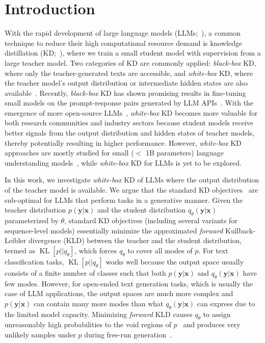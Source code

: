 \documentclass{article}
\def\forkl{\operatorname{KL}[p||q_\theta]}
\def\ps{q_\theta}
\def\pt{p}
\def\bx{\bm{x}}
\def\by{\bm{y}}
\begin{document}
\newpage
\section{Introduction}

With the rapid development of large language models (LLMs;~\citealp{gpt3,plmsurvey,foundation_model,palm,gpt4}),
a common technique to reduce their high computational resource demand is knowledge distillation (KD;~\citealp{kd}), where we train a small student model with supervision from a large teacher model. Two categories of KD are commonly applied: \textit{black-box} KD, where only the teacher-generated texts are accessible, and \textit{white-box} KD, where the teacher model's output distribution or intermediate hidden states are also available~\citep{kdsurvey}.
Recently, \textit{black-box} KD has shown promising results in fine-tuning small models on the prompt-response pairs generated by LLM APIs~\citep{alpaca, vicuna,lamini, ITGPT4}. With the emergence of more open-source LLMs~\citep{opt, llama}, \textit{white-box} KD becomes more valuable for both research communities and industry sectors because student models receive better signals from the output distribution and hidden states of teacher models, thereby potentially resulting in higher performance. However, \textit{white-box} KD approaches are mostly studied for small ($<$ 1B parameters) language understanding models~\citep{distilbert,minilm}, while \textit{white-box} KD for LLMs is yet to be explored.

In this work, we investigate \textit{white-box} KD of LLMs where the output distribution of the teacher model is available. We argue that the standard KD objectives~\citep{skd,lightpaff,vicuna,alpaca} are sub-optimal for LLMs that perform tasks in a generative manner. Given the teacher distribution $\pt(\by|\bx)$ and the student distribution $\ps(\by|\bx)$ parameterized by $\theta$, standard KD objectives (including several variants for sequence-level models) essentially minimize the approximated \textit{forward} Kullback-Leibler divergence (KLD) between the teacher and the student distribution, termed as $\forkl$, which forces $\ps$ to cover all modes of $\pt$. For text classification tasks, $\forkl$ works well because the output space usually consists of a finite number of classes such that both $\pt(\by|\bx)$ and $ \ps(\by|\bx)$ have few modes. However, for open-ended text generation tasks, which is usually the case of LLM applications, the output spaces are much more complex and $\pt(\by|\bx)$ can contain many more modes than what $\ps(\by|\bx)$ can express due to the limited model capacity. Minimizing \textit{forward} KLD causes $\ps$ to assign unreasonably high probabilities to the void regions of $\pt$~\citep{malinin2019reverse} and produces very unlikely samples under $\pt$ during free-run generation~\citep{huszar2015not}.
\end{document}

